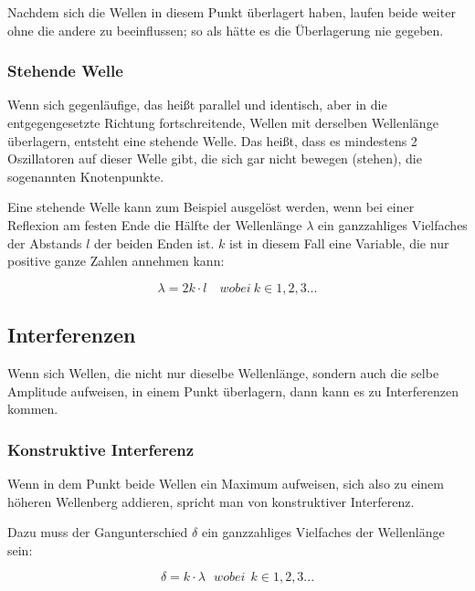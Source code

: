 Nachdem sich die Wellen in diesem Punkt überlagert haben, laufen beide weiter ohne die andere zu beeinflussen; so als hätte es die Überlagerung nie gegeben.

	\subsubsection{Stehende Welle}
	
	Wenn sich gegenläufige, das heißt parallel und identisch, aber in die entgegengesetzte Richtung fortschreitende, Wellen mit derselben Wellenlänge überlagern, entsteht eine stehende Welle. 
	Das heißt, dass es mindestens 2 Oszillatoren auf dieser Welle gibt, die sich gar nicht bewegen (\glqq stehen\grqq), die sogenannten Knotenpunkte.
	
	Eine stehende Welle kann zum Beispiel ausgelöst werden, wenn bei einer Reflexion am festen Ende die Hälfte der Wellenlänge $\lambda$ ein ganzzahliges Vielfaches der Abstands $l$ der beiden Enden ist. $k$ ist in diesem Fall eine Variable, die nur positive ganze Zahlen annehmen kann:
	
	\begin{equation} \label{stehendewelle}
		\lambda = 2k \cdot l \quad wobei \ k \in 1,2,3...
	\end{equation}



\subsection{Interferenzen} \label{sec:interferenz}
Wenn sich Wellen, die nicht nur dieselbe Wellenlänge, sondern auch die selbe Amplitude aufweisen, in einem Punkt überlagern, dann kann es zu Interferenzen kommen.

	\subsubsection{Konstruktive Interferenz}
	
	Wenn in dem Punkt beide Wellen ein Maximum aufweisen, sich also zu einem höheren Wellenberg addieren, spricht man von konstruktiver Interferenz.
	
	Dazu muss der Gangunterschied $\delta$ ein ganzzahliges Vielfaches der Wellenlänge sein:
	
	\begin{equation}	\label{eq:kon_interferenz}
		\delta = k \cdot \lambda \ \ \ wobei \ \ k \in 1,2,3...
	\end{equation}
	
